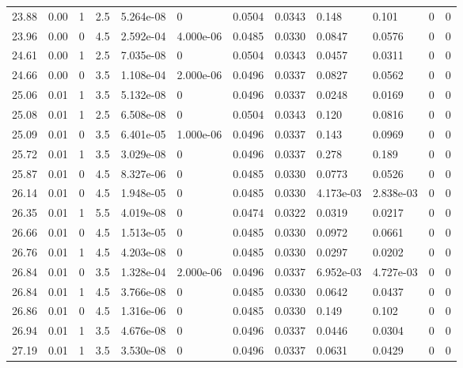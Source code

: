 \documentclass[preview]{standalone}
\begin{document}
{{{\begin{tabular}{L{1.2cm}C{1.2cm} C{0.3cm}C{0.5cm} C{1.4cm}C{1.4cm} C{1.4cm}C{1.4cm} C{1.6cm}C{1.6cm} C{1.6cm}C{1.6cm}}
  23.88  &  0.00  & 1     & 2.5 &  5.264e-08  & 0  &  0.0504&   0.0343& 0.148 & 0.101   &  0 & 0  \\ 
  23.96  &  0.00  & 0     & 4.5 &  2.592e-04  & 4.000e-06  &  0.0485&   0.0330& 0.0847 & 0.0576   &  0 & 0  \\ 
  24.61  &  0.00  & 1     & 2.5 &  7.035e-08  & 0  &  0.0504&   0.0343& 0.0457 & 0.0311   &  0 & 0  \\ 
  24.66  &  0.00  & 0     & 3.5 &  1.108e-04  & 2.000e-06  &  0.0496&   0.0337& 0.0827 & 0.0562   &  0 & 0  \\ 
  25.06  &  0.01  & 1     & 3.5 &  5.132e-08  & 0  &  0.0496&   0.0337& 0.0248 & 0.0169   &  0 & 0  \\ 
  25.08  &  0.01  & 1     & 2.5 &  6.508e-08  & 0  &  0.0504&   0.0343& 0.120 & 0.0816   &  0 & 0  \\ 
  25.09  &  0.01  & 0     & 3.5 &  6.401e-05  & 1.000e-06  &  0.0496&   0.0337& 0.143 & 0.0969   &  0 & 0  \\ 
  25.72  &  0.01  & 1     & 3.5 &  3.029e-08  & 0  &  0.0496&   0.0337& 0.278 & 0.189   &  0 & 0  \\ 
  25.87  &  0.01  & 0     & 4.5 &  8.327e-06  & 0  &  0.0485&   0.0330& 0.0773 & 0.0526   &  0 & 0  \\ 
  26.14  &  0.01  & 0     & 4.5 &  1.948e-05  & 0  &  0.0485&   0.0330& 4.173e-03 & 2.838e-03   &  0 & 0  \\ 
  26.35  &  0.01  & 1     & 5.5 &  4.019e-08  & 0  &  0.0474&   0.0322& 0.0319 & 0.0217   &  0 & 0  \\ 
  26.66  &  0.01  & 0     & 4.5 &  1.513e-05  & 0  &  0.0485&   0.0330& 0.0972 & 0.0661   &  0 & 0  \\ 
  26.76  &  0.01  & 1     & 4.5 &  4.203e-08  & 0  &  0.0485&   0.0330& 0.0297 & 0.0202   &  0 & 0  \\ 
  26.84  &  0.01  & 0     & 3.5 &  1.328e-04  & 2.000e-06  &  0.0496&   0.0337& 6.952e-03 & 4.727e-03   &  0 & 0  \\ 
  26.84  &  0.01  & 1     & 4.5 &  3.766e-08  & 0  &  0.0485&   0.0330& 0.0642 & 0.0437   &  0 & 0  \\ 
  26.86  &  0.01  & 0     & 4.5 &  1.316e-06  & 0  &  0.0485&   0.0330& 0.149 & 0.102   &  0 & 0  \\ 
  26.94  &  0.01  & 1     & 3.5 &  4.676e-08  & 0  &  0.0496&   0.0337& 0.0446 & 0.0304   &  0 & 0  \\ 
  27.19  &  0.01  & 1     & 3.5 &  3.530e-08  & 0  &  0.0496&   0.0337& 0.0631 & 0.0429   &  0 & 0  \\ 

\end{tabular}}}}
\end{document}
